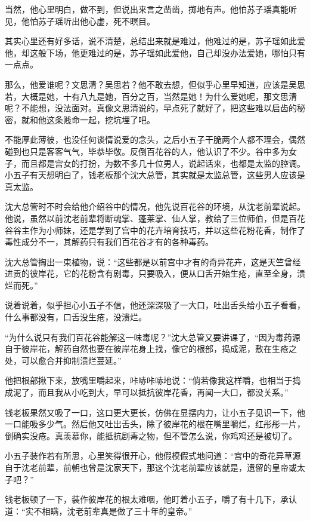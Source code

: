 当然，他心里明白，做不到，但说出来言之凿凿，掷地有声。他怕苏子瑶真能听见，他怕苏子瑶听出他心虚，死不瞑目。

其实心里还有好多话，说不清楚，总结出来就是难过，他难过的是，苏子瑶如此爱他，却这般下场，他更难过的是，苏子瑶如此爱他，自己却没办法爱她，哪怕只有一点点。

那么，他爱谁呢？文思清？吴思若？他不敢去想，但似乎心里早知道，应该是吴思若，大概是她，十有八九是她，百分之百，当然是她！为什么爱她呢，那文思清呢？不能想，没法面对。真像文思清说的，早点死了就好了，把这些难以启齿的秘密，就和他这条贱命一起，挖坑埋了吧。

不能厚此薄彼，也没任何谈情说爱的念头，之后小五子干脆两个人都不理会，偶然碰到也只是客客气气，毕恭毕敬。反倒百花谷的人，他认识了不少。谷中多为女子，而且都是宫女的打扮，为数不多几十位男人，说起话来，也都是太监的腔调。小五子有天想明白了，钱老板那个沈大总管，其实就是太监总管，这些男人应该是真太监。

沈大总管时不时会给他介绍谷中的情况，他先说百花谷的环境，从沈老前辈说起。他说，虽然以前沈老前辈将断魂掌、蓬莱掌、仙人掌，教给了三位师伯，但是百花谷谷主作为小师妹，还是学到了宫中的花卉培育技巧，并以这些花粉花香，制作了毒性成分不一，其解药只有我们百花谷才有的各种毒药。

沈大总管掏出一束植物，说：“这些都是以前宫中才有的奇异花卉，这是天竺曾经进贡的彼岸花，它的花粉含有剧毒，只要吸入，便从口舌开始生疮，直至全身，溃烂而死。”

说着说着，似乎担心小五子不信，他还深深吸了一大口，吐出舌头给小五子看看，什么事都没有，口舌没生疮，没溃烂。

“为什么说只有我们百花谷能解这一味毒呢？”沈大总管又要讲课了，“因为毒药源自于彼岸花，解药自然也要在彼岸花身上找，像它的根部，捣成泥，敷在生疮之处，可以愈合并抑制溃烂蔓延。”

他把根部揪下来，放嘴里嚼起来，咔哧咔哧地说：“倘若像我这样嚼，也相当于捣成泥了，而且我从小吃到大，早可以抵抗彼岸花香，再闻一大口，都没关系。”

钱老板果然又吸了一口，这口更大更长，仿佛在显摆内力，让小五子见识一下，他一口能吸多少气。然后他又吐出舌头，除了彼岸花的根在嘴里嚼烂，红彤彤一片，倒确实没疮。真羡慕你，能抵抗剧毒之物，但不管怎么说，你鸡鸡还是被切了。

小五子装作若有所思，心里笑得很开心，他假模假式地问道：“宫中的奇花异草源自于沈老前辈，前朝也曾是沈家天下，那这个沈老前辈应该就是，遗留的皇帝或太子吧？”

钱老板顿了一下，装作彼岸花的根太难咽，他盯着小五子，嚼了有十几下，承认道：“实不相瞒，沈老前辈真是做了三十年的皇帝。”


